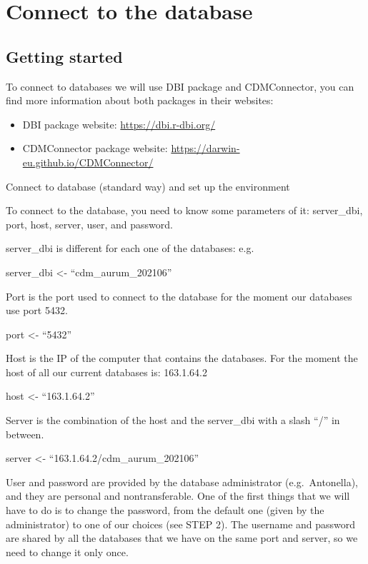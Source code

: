 \documentclass[
  letterpaper,
  DIV=11,
  numbers=noendperiod]{scrreprt}
\begin{document}

\hypertarget{connect-to-the-database}{%
\chapter{Connect to the database}\label{connect-to-the-database}}

\hypertarget{getting-started}{%
\section{Getting started}\label{getting-started}}

To connect to databases we will use DBI package and CDMConnector, you
can find more information about both packages in their websites:

\begin{itemize}
\item
  DBI package website: \url{https://dbi.r-dbi.org/}
\item
  CDMConnector package website:
  \url{https://darwin-eu.github.io/CDMConnector/}
\end{itemize}

Connect to database (standard way) and set up the environment

To connect to the database, you need to know some parameters of it:
server\_dbi, port, host, server, user, and password.

server\_dbi is different for each one of the databases: e.g.

server\_dbi \textless- ``cdm\_aurum\_202106''

Port is the port used to connect to the database for the moment our
databases use port 5432.

port \textless- ``5432''

Host is the IP of the computer that contains the databases. For the
moment the host of all our current databases is: 163.1.64.2

host \textless- ``163.1.64.2''

Server is the combination of the host and the server\_dbi with a slash
``/'' in between.

server \textless- ``163.1.64.2/cdm\_aurum\_202106''

User and password are provided by the database administrator
(e.g.~Antonella), and they are personal and nontransferable. One of the
first things that we will have to do is to change the password, from the
default one (given by the administrator) to one of our choices (see STEP
2). The username and password are shared by all the databases that we
have on the same port and server, so we need to change it only once.
\end{document}
